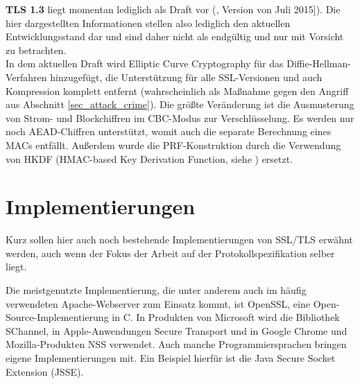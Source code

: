 \textbf{TLS 1.3} liegt momentan lediglich als Draft vor (\cite{tls13}, Version von Juli 2015]). Die hier dargestellten Informationen stellen also lediglich den aktuellen Entwicklungsstand dar und sind daher nicht als endgültig und nur mit Vorsicht zu betrachten.\\
In dem aktuellen Draft wird Elliptic Curve Cryptography für das Diffie-Hellman-Verfahren hinzugefügt, die Unterstützung für alle SSL-Versionen und auch Kompression komplett entfernt (wahrscheinlich als Maßnahme gegen den Angriff aus Abschnitt \ref{sec_attack_crime}). Die größte Veränderung ist die Ausmusterung von Strom- und Blockchiffren im CBC-Modus zur Verschlüsselung. Es werden nur noch AEAD-Chiffren unterstützt, womit auch die separate Berechnung eines MACs entfällt. Außerdem wurde die PRF-Konstruktion durch die Verwendung von HKDF (HMAC-based Key Derivation Function, siehe \cite{krawczyk10}) ersetzt.



\section{Implementierungen}

Kurz sollen hier auch noch bestehende Implementierungen von SSL/TLS erwähnt werden, auch wenn der Fokus der Arbeit auf der Protokollspezifikation selber liegt.

Die meistgenutzte Implementierung, die unter anderem auch im häufig verwendeten Apache-Webserver zum Einsatz kommt, ist OpenSSL, eine Open-Source-Implementierung in C. In Produkten von Microsoft wird die Bibliothek SChannel, in Apple-Anwendungen Secure Transport und in Google Chrome und Mozilla-Produkten NSS verwendet. Auch manche Programmiersprachen bringen eigene Implementierungen mit. Ein Beispiel hierfür ist die Java Secure Socket Extension (JSSE).


